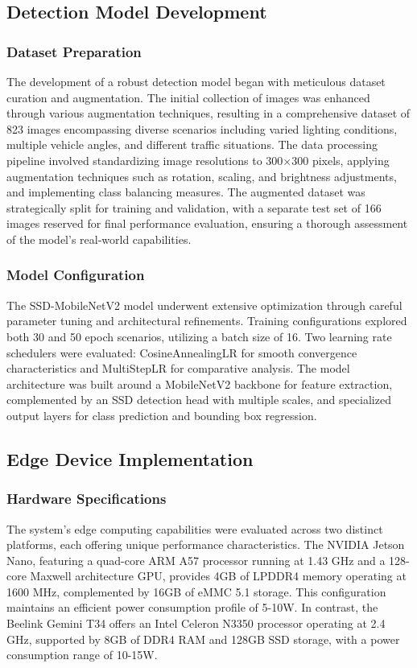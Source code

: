 \subsection{Detection Model Development}

\subsubsection{Dataset Preparation}
The development of a robust detection model began with meticulous dataset curation and augmentation. The initial collection of images was enhanced through various augmentation techniques, resulting in a comprehensive dataset of 823 images encompassing diverse scenarios including varied lighting conditions, multiple vehicle angles, and different traffic situations. The data processing pipeline involved standardizing image resolutions to 300×300 pixels, applying augmentation techniques such as rotation, scaling, and brightness adjustments, and implementing class balancing measures. The augmented dataset was strategically split for training and validation, with a separate test set of 166 images reserved for final performance evaluation, ensuring a thorough assessment of the model's real-world capabilities.

\subsubsection{Model Configuration}
The SSD-MobileNetV2 model underwent extensive optimization through careful parameter tuning and architectural refinements. Training configurations explored both 30 and 50 epoch scenarios, utilizing a batch size of 16. Two learning rate schedulers were evaluated: CosineAnnealingLR for smooth convergence characteristics and MultiStepLR for comparative analysis. The model architecture was built around a MobileNetV2 backbone for feature extraction, complemented by an SSD detection head with multiple scales, and specialized output layers for class prediction and bounding box regression.

\subsection{Edge Device Implementation}

\subsubsection{Hardware Specifications}
The system's edge computing capabilities were evaluated across two distinct platforms, each offering unique performance characteristics. The NVIDIA Jetson Nano, featuring a quad-core ARM A57 processor running at 1.43 GHz and a 128-core Maxwell architecture GPU, provides 4GB of LPDDR4 memory operating at 1600 MHz, complemented by 16GB of eMMC 5.1 storage. This configuration maintains an efficient power consumption profile of 5-10W. In contrast, the Beelink Gemini T34 offers an Intel Celeron N3350 processor operating at 2.4 GHz, supported by 8GB of DDR4 RAM and 128GB SSD storage, with a power consumption range of 10-15W.

